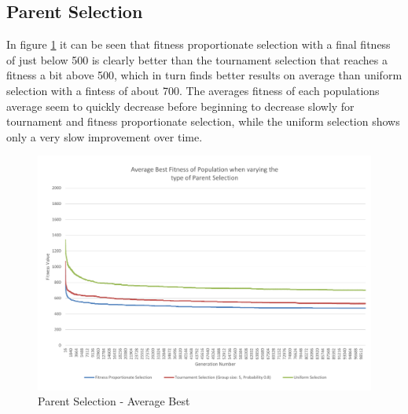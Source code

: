 \clearpage

\subsection{Parent Selection} %
\label{sub:parent_selection}

In figure \ref{fig:ctpsab} it can be seen that fitness proportionate selection with a final fitness of just below 500 is clearly better than the tournament selection that reaches a fitness a bit above 500, which in turn finds better results on average than uniform selection with a fintess of about 700. The averages fitness of each populations average seem to quickly decrease before beginning to decrease slowly for tournament and fitness proportionate selection, while the uniform selection shows only a very slow improvement over time.

\begin{landscape}
\begin{figure}[thbp]
	\centerline{\includegraphics[height=0.945\textwidth]{figures/CircleTests/ParentSelection/CircleTestParentSelectionAverageBest.pdf}}
	\caption{Parent Selection - Average Best}
	\label{fig:ctpsab}
\end{figure}
\end{landscape}

